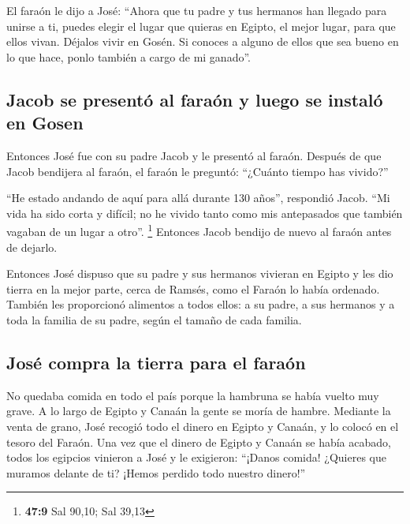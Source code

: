  El faraón le dijo a José: ``Ahora que tu padre y tus
hermanos han llegado para unirse a ti,  puedes elegir el
lugar que quieras en Egipto, el mejor lugar, para que ellos vivan.
Déjalos vivir en Gosén. Si conoces a alguno de ellos que sea bueno en lo
que hace, ponlo también a cargo de mi ganado''.

\hypertarget{jacob-se-presentuxf3-al-farauxf3n-y-luego-se-instaluxf3-en-gosen}{%
\subsection{Jacob se presentó al faraón y luego se instaló en
Gosen}\label{jacob-se-presentuxf3-al-farauxf3n-y-luego-se-instaluxf3-en-gosen}}

 Entonces José fue con su padre Jacob y le presentó al
faraón. Después de que Jacob bendijera al faraón,  el
faraón le preguntó: ``¿Cuánto tiempo has vivido?''

 ``He estado andando de aquí para allá durante 130 años'',
respondió Jacob. ``Mi vida ha sido corta y difícil; no he vivido tanto
como mis antepasados que también vagaban de un lugar a otro''.
\footnote{\textbf{47:9} Sal 90,10; Sal 39,13}  Entonces
Jacob bendijo de nuevo al faraón antes de dejarlo.

 Entonces José dispuso que su padre y sus hermanos
vivieran en Egipto y les dio tierra en la mejor parte, cerca de Ramsés,
como el Faraón lo había ordenado.  También les
proporcionó alimentos a todos ellos: a su padre, a sus hermanos y a toda
la familia de su padre, según el tamaño de cada familia.

\hypertarget{josuxe9-compra-la-tierra-para-el-farauxf3n}{%
\subsection{José compra la tierra para el
faraón}\label{josuxe9-compra-la-tierra-para-el-farauxf3n}}

 No quedaba comida en todo el país porque la hambruna se
había vuelto muy grave. A lo largo de Egipto y Canaán la gente se moría
de hambre.  Mediante la venta de grano, José recogió todo
el dinero en Egipto y Canaán, y lo colocó en el tesoro del Faraón.
 Una vez que el dinero de Egipto y Canaán se había
acabado, todos los egipcios vinieron a José y le exigieron: ``¡Danos
comida! ¿Quieres que muramos delante de ti? ¡Hemos perdido todo nuestro
dinero!''


